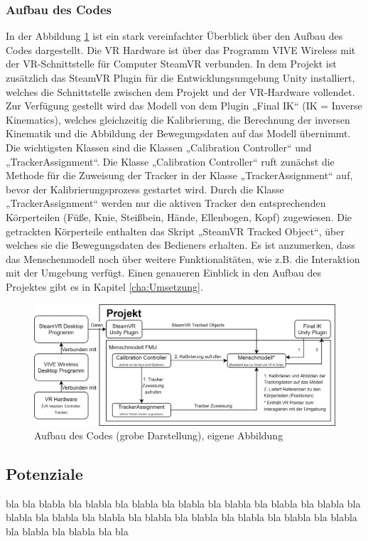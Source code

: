 \subsubsection{Aufbau des Codes}\label{sec:CCode}
In der Abbildung \ref{fig:CCodeDarstellung} ist ein stark vereinfachter Überblick über den Aufbau des Codes dargestellt. Die VR Hardware ist über das Programm VIVE Wireless mit der VR-Schnittstelle für Computer SteamVR verbunden. In dem Projekt ist zusätzlich das SteamVR Plugin für die Entwicklungsumgebung Unity installiert, welches die Schnittstelle zwischen dem Projekt und der VR-Hardware vollendet. Zur Verfügung gestellt wird das Modell von dem Plugin „Final IK“ (IK = Inverse Kinematics), welches gleichzeitig die Kalibrierung, die Berechnung der inversen Kinematik und die Abbildung der Bewegungsdaten auf das Modell übernimmt. Die wichtigsten Klassen sind die Klassen „Calibration Controller“ und „TrackerAssignment“. Die Klasse „Calibration Controller“ ruft zunächst die Methode für die Zuweisung der Tracker in der Klasse „TrackerAssignment“ auf, bevor der Kalibrierungsprozess gestartet wird. Durch die Klasse „TrackerAssignment“ werden nur die aktiven Tracker den entsprechenden Körperteilen (Füße, Knie, Steißbein, Hände, Ellenbogen, Kopf) zugewiesen. Die getrackten Körperteile enthalten das Skript „SteamVR Tracked Object“, über welches sie die Bewegungsdaten des Bedieners erhalten. Es ist anzumerken, dass das Menschenmodell noch über weitere Funktionalitäten, wie z.B. die Interaktion mit der Umgebung verfügt. Einen genaueren Einblick in den Aufbau des Projektes gibt es in Kapitel \ref{cha:Umsetzung}.
\begin{figure}[h]
	\centering
	\includegraphics[width=1\linewidth]{Bilder/A25_CCodeDarstellung}
	\caption{Aufbau des Codes (grobe Darstellung), eigene Abbildung}
	\label{fig:CCodeDarstellung}
\end{figure}

\subsection{Potenziale}\label{sec:PotenzialeFMU}
bla bla blabla bla blabla bla blabla bla blabla bla blabla bla blabla bla blabla bla blabla bla blabla bla blabla bla blabla bla blabla bla blabla bla blabla bla blabla bla blabla bla blabla bla bla
